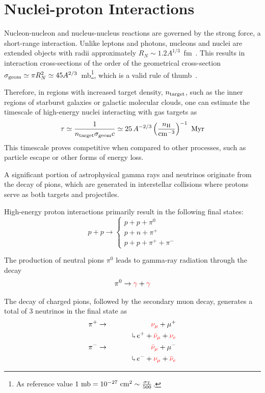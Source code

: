 \section{Nuclei-proton Interactions}

Nucleon-nucleon and nucleus-nucleus reactions are governed by the strong force, a short-range interaction. Unlike leptons and photons, nucleons and nuclei are extended objects with radii approximately $R_N \sim 1.2 A^{1/3}$~fm~. This results in interaction cross-sections of the order of the geometrical cross-section $\sigma_{\rm geom} \simeq \pi R_N^2 \simeq 45 A^{2/3}$~mb\footnote{As reference value $1~\text{mb} = 10^{-27}~\text{cm}^2 \sim \frac{\sigma_{\rm T}}{500}$.}, which is a valid rule of thumb~\cite{Letaw1983apjs}.

Therefore, in regions with increased target density, \( n_{\rm target} \), such as the inner regions of starburst galaxies or galactic molecular clouds, one can estimate the timescale of high-energy nuclei interacting with gas targets as
%
\[
\tau \simeq \frac{1}{n_{\rm target} \sigma_{\rm geom} c} \simeq 25 \, A^{-2/3} \left( \frac{n_{\rm H}}{\text{cm}^{-3}} \right)^{-1}~\text{Myr}
\]
%
This timescale proves competitive when compared to other processes, such as particle escape or other forms of energy loss.

A significant portion of astrophysical gamma rays and neutrinos originate from the decay of pions, which are generated in interstellar collisions where protons serve as both targets and projectiles.

High-energy proton interactions primarily result in the following final states:
%
\[
p + p \rightarrow 
\begin{cases}
p + p + \pi^0 \\
p + n + \pi^+ \\
p + p + \pi^+ + \pi^- 
\end{cases}
\]

The production of neutral pions $\pi^0$ leads to gamma-ray radiation through the decay 
%
\[ 
\pi^0 \rightarrow {\color{red}\gamma} + {\color{red}\gamma} 
\]

The decay of charged pions, followed by the secondary muon decay, generates a total of 3 neutrinos in the final state as 
%
\begin{eqnarray*}
\pi^+ & \rightarrow & {\color{red}\nu_\mu} + \mu^+ \\
& & \hphantom{\nu_\mu + l} \drsh \, e^+ + {\color{red}\bar \nu_\mu} + {\color{red}\nu_e} \\
\pi^- & \rightarrow & {\color{red}\bar \nu_\mu} + \mu^- \\
& &  \hphantom{\bar \nu_\mu + l} \drsh \, e^- + {\color{red}\nu_\mu} + {\color{red}\bar \nu_e} 
\end{eqnarray*}


